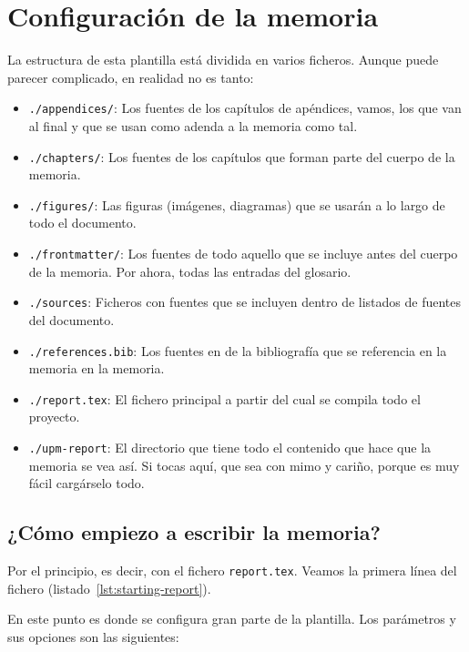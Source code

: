 \chapter{Configuración de la memoria}

La estructura de esta plantilla está dividida en varios ficheros. Aunque puede parecer complicado, en realidad no es tanto:

\begin{itemize}
    \item \texttt{./appendices/}: Los fuentes de los capítulos de apéndices, vamos, los que van al final y que se usan como adenda a la memoria como tal.
    \item \texttt{./chapters/}: Los fuentes de los capítulos que forman parte del cuerpo de la memoria.
    \item \texttt{./figures/}: Las figuras (imágenes, diagramas) que se usarán a lo largo de todo el documento.
    \item \texttt{./frontmatter/}: Los fuentes de todo aquello que se incluye antes del cuerpo de la memoria. Por ahora, todas las entradas del glosario.
    \item \texttt{./sources}: Ficheros con fuentes que se incluyen dentro de listados de fuentes del documento.
    \item \texttt{./references.bib}: Los fuentes en  de la bibliografía que se referencia en la memoria en la memoria.
    \item \texttt{./report.tex}: El fichero principal a partir del cual se compila todo el proyecto.
    \item \texttt{./upm-report}: El directorio que tiene todo el contenido que hace que la memoria se vea así. Si tocas aquí, que sea con mimo y cariño, porque es muy fácil cargárselo todo.
\end{itemize}

\section{¿Cómo empiezo a escribir la memoria?}

Por el principio, es decir, con el fichero \texttt{report.tex}. Veamos la primera línea del fichero (listado~\ref{lst:starting-report}).



En este punto es donde se configura gran parte de la plantilla. Los parámetros y sus opciones son las siguientes:

